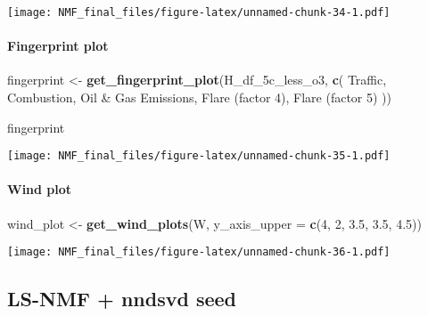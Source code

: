 \documentclass[
]{article}
\newenvironment{Shaded}{\begin{snugshade}}{\end{snugshade}}
\newcommand{\AttributeTok}[1]{\textcolor[rgb]{0.13,0.29,0.53}{#1}}
\newcommand{\DecValTok}[1]{\textcolor[rgb]{0.00,0.00,0.81}{#1}}
\newcommand{\FloatTok}[1]{\textcolor[rgb]{0.00,0.00,0.81}{#1}}
\newcommand{\FunctionTok}[1]{\textcolor[rgb]{0.13,0.29,0.53}{\textbf{#1}}}
\newcommand{\NormalTok}[1]{#1}
\newcommand{\OtherTok}[1]{\textcolor[rgb]{0.56,0.35,0.01}{#1}}
\newcommand{\StringTok}[1]{\textcolor[rgb]{0.31,0.60,0.02}{#1}}
\begin{document}
\texttt{[image: NMF\_final\_files/figure-latex/unnamed-chunk-34-1.pdf]}

\paragraph{Fingerprint plot}\label{fingerprint-plot}

\begin{Shaded}
\begin{Highlighting}[]
\NormalTok{fingerprint }\OtherTok{\textless{}{-}} \FunctionTok{get\_fingerprint\_plot}\NormalTok{(H\_df\_5c\_less\_o3, }\FunctionTok{c}\NormalTok{(}
      \StringTok{\textquotesingle{}Traffic\textquotesingle{}}\NormalTok{,}
      \StringTok{\textquotesingle{}Combustion\textquotesingle{}}\NormalTok{,}
      \StringTok{\textquotesingle{}Oil \& Gas Emissions\textquotesingle{}}\NormalTok{,}
      \StringTok{\textquotesingle{}Flare (factor 4)\textquotesingle{}}\NormalTok{,}
      \StringTok{\textquotesingle{}Flare (factor 5)\textquotesingle{}}
\NormalTok{    ))}

\NormalTok{fingerprint}
\end{Highlighting}
\end{Shaded}

\texttt{[image: NMF\_final\_files/figure-latex/unnamed-chunk-35-1.pdf]}

\paragraph{Wind plot}\label{wind-plot}

\newline

\begin{Shaded}
\begin{Highlighting}[]
\NormalTok{wind\_plot }\OtherTok{\textless{}{-}} \FunctionTok{get\_wind\_plots}\NormalTok{(W, }\AttributeTok{y\_axis\_upper =} \FunctionTok{c}\NormalTok{(}\DecValTok{4}\NormalTok{, }\DecValTok{2}\NormalTok{, }\FloatTok{3.5}\NormalTok{, }\FloatTok{3.5}\NormalTok{, }\FloatTok{4.5}\NormalTok{))}
\end{Highlighting}
\end{Shaded}

\texttt{[image: NMF\_final\_files/figure-latex/unnamed-chunk-36-1.pdf]}

\subsection{LS-NMF + nndsvd seed}\label{ls-nmf-nndsvd-seed}
\end{document}
